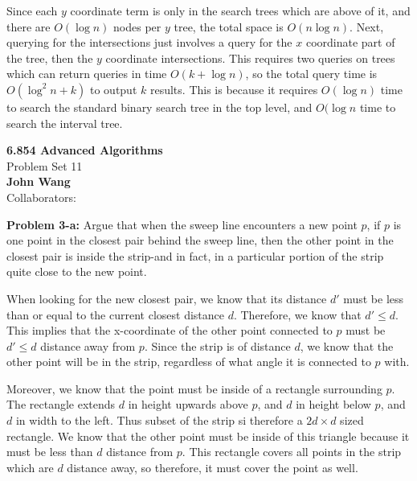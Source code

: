 \documentclass[psamsfonts]{amsart}
\newenvironment{sol}{\vspace{0.25cm}{\large \bfseries Solution:}}{\qedsymbol}
\newenvironment{prob}[1]{\begin{framed}{\large \bfseries Problem #1:}}{\end{framed}}
\newcommand{\makenewtitle}{
    \begin{center}
    {\huge \bfseries 6.854 Advanced Algorithms} \\
    Problem Set 11\\
    \vspace{0.25cm}
    {\bfseries John Wang} \\
    Collaborators:  
    \end{center}
    \vspace{0.5cm}
}
\begin{document}
\begin{sol}
Since each $y$ coordinate term is only in the search trees which are above of it, and there are $O(\log n)$ nodes per $y$ tree, the total space is $O(n \log n)$. Next, querying for the intersections just involves a query for the $x$ coordinate part of the tree, then the $y$ coordinate intersections. This requires two queries on trees which can return queries in time $O(k + \log n)$, so the total query time is $O(\log^2 n + k)$ to output $k$ results. This is because it requires $O(\log n)$ time to search the standard binary search tree in the top level, and $O(\log n$ time to search the interval tree. 
\end{sol}

\newpage
\makenewtitle

\begin{prob}{3-a}
Argue that when the sweep line encounters a new point $p$, if $p$ is one point in the closest pair behind the sweep line, then the other point in the closest pair is inside the strip-and in fact, in a particular portion of the strip quite close to the new point.
\end{prob}
\begin{sol}
When looking for the new closest pair, we know that its distance $d'$ must be less than or equal to the current closest distance $d$. Therefore, we know that $d' \leq d$. This implies that the x-coordinate of the other point connected to $p$ must be $d' \leq d$ distance away from $p$. Since the strip is of distance $d$, we know that the other point will be in the strip, regardless of what angle it is connected to $p$ with. 

Moreover, we know that the point must be inside of a rectangle surrounding $p$. The rectangle extends $d$ in height upwards above $p$, and $d$ in height below $p$, and $d$ in width to the left. Thus subset of the strip si therefore a $2d \times d$ sized rectangle. We know that the other point must be inside of this triangle because it must be less than $d$ distance from $p$. This rectangle covers all points in the strip which are $d$ distance away, so therefore, it must cover the point as well.
\end{sol}
\end{document}
